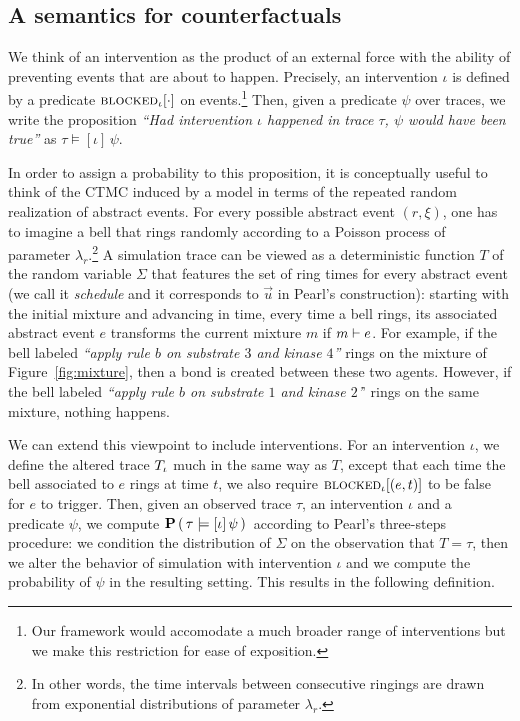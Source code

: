 \subsection{A semantics for counterfactuals}
\label{subsec:counterfactuals-semantics}
We think of an intervention as the product of an external force with
the ability of preventing events that are about to happen. Precisely,
an intervention $\iota$ is defined by a predicate
${\textsc{blocked}}_{\iota}[\cdot]$ on events.\footnote{Our framework would
  accomodate a much broader range of interventions but we make this
  restriction for ease of exposition.}  Then, given a predicate $\psi$
over traces, we write the proposition \textit{``Had
  intervention $\iota$ happened in trace $\tau$, $\psi$ would have
  been true''} as $\tau \models [\iota] \, \psi.$


In order to assign a probability to this proposition, it is
conceptually useful to think of the CTMC induced by a model in terms
of the repeated random realization of abstract events.  For every
possible abstract event $(r, \xi)$, one has to imagine a bell that
rings randomly according to a Poisson process of parameter
$\lambda_r$.\footnote{In other words, the time intervals between
  consecutive ringings are drawn from exponential distributions of
  parameter $\lambda_r$.}  A simulation trace can be viewed as a
deterministic function $T$ of the random variable $\Sigma$ that
features the set of ring times for every abstract event (we call it
\emph{schedule} and it corresponds to $\vec{u}$ in Pearl's
construction): starting with the initial mixture and advancing in
time, every time a bell rings, its associated abstract event $e$
transforms the current mixture $m$ if $m \vdash e$. For
example, if the bell labeled \textit{``apply rule $b$ on substrate $3$
  and kinase $4$''} rings on the mixture of Figure~\ref{fig:mixture},
then a bond is created between these two agents. However, if the bell
labeled \textit{``apply rule $b$ on substrate $1$ and kinase $2$'}'
rings on the same mixture, nothing happens.

We can extend this viewpoint to include interventions. For an
intervention $\iota$, we define the altered trace ${T_\iota}{}$ much in
the same way as $T$, except that each time the bell associated to $e$
rings at time $t$, we also require ${\textsc{blocked}}_{\iota}[(e, t)]$ to be
false for $e$ to trigger. Then, given an observed trace $\tau$, an
intervention $\iota$ and a predicate $\psi$, we compute $\mathbf{P} \left(\, \tau \models [\iota] \, \psi{} \,\right){}$
according to Pearl's three-steps procedure: \ItAbduction{} we condition
the distribution of $\Sigma$ on the observation that $T=\tau$, then
\ItAction{} we alter the behavior of simulation with intervention $\iota$
and \ItPrediction{} we compute the probability of $\psi$ in the resulting
setting. This results in the following definition.

